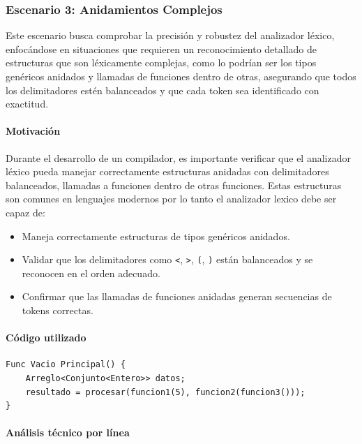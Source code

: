 \documentclass{article}
\begin{document}
\subsubsection{Escenario 3:  Anidamientos Complejos }

Este escenario busca comprobar la precisión y robustez del analizador léxico, enfocándose en situaciones que requieren un reconocimiento detallado de estructuras que son léxicamente complejas, como lo podrían ser los tipos genéricos anidados  y llamadas de funciones dentro de otras, asegurando que todos los delimitadores estén balanceados y que cada token sea identificado con exactitud.


\paragraph{Motivación}


Durante el desarrollo de un compilador, es importante verificar que el analizador léxico pueda manejar correctamente estructuras anidadas con delimitadores balanceados, llamadas a funciones dentro de otras funciones. Estas estructuras son comunes en lenguajes modernos por lo tanto el analizador lexico debe ser capaz de:

\begin{itemize}
  \item Maneja correctamente estructuras de tipos genéricos anidados.
  \item Validar que los delimitadores como \texttt{<}, \texttt{>}, \texttt{(}, \texttt{)} están balanceados y se reconocen en el orden adecuado.
  \item Confirmar que las llamadas de funciones anidadas generan secuencias de tokens correctas.
\end{itemize}

\paragraph{Código utilizado}

\begin{lstlisting}[style=mypython, caption={ Fragmento con anidamientos léxicos complejos}]
Func Vacio Principal() {
    Arreglo<Conjunto<Entero>> datos;        
    resultado = procesar(funcion1(5), funcion2(funcion3()));  
}
\end{lstlisting}
\paragraph{Análisis técnico por línea}
\end{document}
